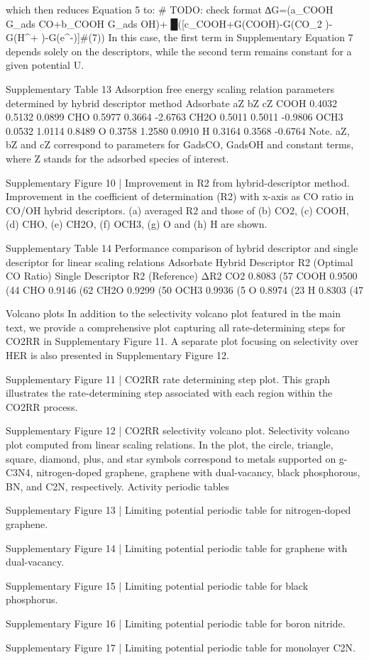 which then reduces Equation 5 to:
# TODO: check format
∆G=(a_COOH G_ads CO+b_COOH G_ads OH)+
█([c_COOH+G(COOH)-G(CO_2 )-G(H^+ )-G(e^-)]#(7))
In this case, the first term in Supplementary Equation 7 depends solely on the descriptors, while the second term remains constant for a given potential U.


Supplementary Table 13
Adsorption free energy scaling relation parameters determined by hybrid descriptor method
Adsorbate	aZ	bZ	cZ
COOH	0.4032	0.5132	0.0899
CHO	0.5977	0.3664	-2.6763
CH2O	0.5011	0.5011	-0.9806
OCH3	0.0532	1.0114	0.8489
O	0.3758	1.2580	0.0910
H	0.3164	0.3568	-0.6764
Note. aZ, bZ and cZ correspond to parameters for GadsCO, GadsOH and constant terms, where Z stands for the adsorbed species of interest.



Supplementary Figure 10 | Improvement in R2 from hybrid-descriptor method. Improvement in the coefficient of determination (R2) with x-axis as CO ratio in CO/OH hybrid descriptors. (a) averaged R2 and those of (b) CO2, (c) COOH, (d) CHO, (e) CH2O, (f) OCH3, (g) O and (h) H are shown.

Supplementary Table 14
Performance comparison of hybrid descriptor and single descriptor for linear scaling relations
Adsorbate	Hybrid Descriptor R2
(Optimal CO Ratio)	Single Descriptor R2
(Reference)	ΔR2
CO2	0.8083 (57 %
COOH	0.9500 (44 %
CHO	0.9146 (62 %
CH2O	0.9299 (50 %
OCH3	0.9936 (5 %
O	0.8974 (23 %
H	0.8303 (47 %


Volcano plots
In addition to the selectivity volcano plot featured in the main text, we provide a comprehensive plot capturing all rate-determining steps for CO2RR in Supplementary Figure 11. A separate plot focusing on selectivity over HER is also presented in Supplementary Figure 12.


Supplementary Figure 11 | CO2RR rate determining step plot. This graph illustrates the rate-determining step associated with each region within the CO2RR process.


Supplementary Figure 12 | CO2RR selectivity volcano plot. Selectivity volcano plot computed from linear scaling relations. In the plot, the circle, triangle, square, diamond, plus, and star symbols correspond to metals supported on g-C3N4, nitrogen-doped graphene, graphene with dual-vacancy, black phosphorous, BN, and C2N, respectively.
Activity periodic tables


Supplementary Figure 13 | Limiting potential periodic table for nitrogen-doped graphene.


Supplementary Figure 14 | Limiting potential periodic table for graphene with dual-vacancy.


Supplementary Figure 15 | Limiting potential periodic table for black phosphorus.


Supplementary Figure 16 | Limiting potential periodic table for boron nitride.


Supplementary Figure 17 | Limiting potential periodic table for monolayer C2N.
